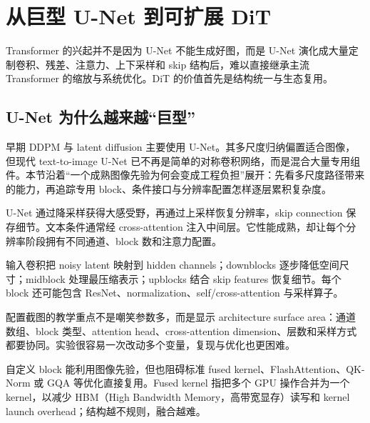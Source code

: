 \section{从巨型 U-Net 到可扩展 DiT}

Transformer 的兴起并不是因为 U-Net 不能生成好图，而是 U-Net 演化成大量定制卷积、残差、注意力、上下采样和 skip 结构后，难以直接继承主流 Transformer 的缩放与系统优化。DiT 的价值首先是结构统一与生态复用。

\subsection{U-Net 为什么越来越“巨型”}

早期 DDPM 与 latent diffusion 主要使用 U-Net。其多尺度归纳偏置适合图像，但现代 text-to-image U-Net 已不再是简单的对称卷积网络，而是混合大量专用组件。本节沿着“一个成熟图像先验为何会变成工程负担”展开：先看多尺度路径带来的能力，再追踪专用 block、条件接口与分辨率配置怎样逐层累积复杂度。


U-Net 通过降采样获得大感受野，再通过上采样恢复分辨率，skip connection 保存细节。文本条件通常经 cross-attention 注入中间层。它性能成熟，却让每个分辨率阶段拥有不同通道、block 数和注意力配置。


输入卷积把 noisy latent 映射到 hidden channels；downblocks 逐步降低空间尺寸；midblock 处理最压缩表示；upblocks 结合 skip features 恢复细节。每个 block 还可能包含 ResNet、normalization、self/cross-attention 与采样算子。


配置截图的教学重点不是嘲笑参数多，而是显示 architecture surface area：通道数组、block 类型、attention head、cross-attention dimension、层数和采样方式都要协同。实验很容易一次改动多个变量，复现与优化也更困难。


自定义 block 能利用图像先验，但也阻碍标准 fused kernel、FlashAttention、QK-Norm 或 GQA 等优化直接复用。Fused kernel 指把多个 GPU 操作合并为一个 kernel，以减少 HBM（High Bandwidth Memory，高带宽显存）读写和 kernel launch overhead；结构越不规则，融合越难。

